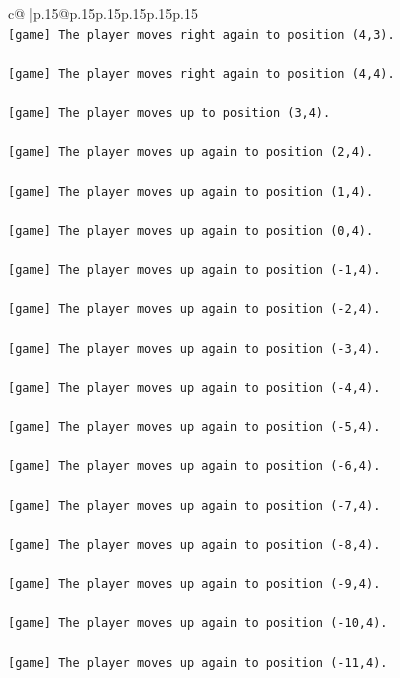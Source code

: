\documentclass{article}
\begin{document}
{\begin{supertabular}{c@{$\;$}|p{.15\linewidth}@{}p{.15\linewidth}p{.15\linewidth}p{.15\linewidth}p{.15\linewidth}p{.15\linewidth}}
{{{\\ 
\texttt{{[}game{]} The player moves right again to position (4,3).} \\
\\ 
\texttt{{[}game{]} The player moves right again to position (4,4).} \\
\\ 
\texttt{{[}game{]} The player moves up to position (3,4).} \\
\\ 
\texttt{{[}game{]} The player moves up again to position (2,4).} \\
\\ 
\texttt{{[}game{]} The player moves up again to position (1,4).} \\
\\ 
\texttt{{[}game{]} The player moves up again to position (0,4).} \\
\\ 
\texttt{{[}game{]} The player moves up again to position ({-}1,4).} \\
\\ 
\texttt{{[}game{]} The player moves up again to position ({-}2,4).} \\
\\ 
\texttt{{[}game{]} The player moves up again to position ({-}3,4).} \\
\\ 
\texttt{{[}game{]} The player moves up again to position ({-}4,4).} \\
\\ 
\texttt{{[}game{]} The player moves up again to position ({-}5,4).} \\
\\ 
\texttt{{[}game{]} The player moves up again to position ({-}6,4).} \\
\\ 
\texttt{{[}game{]} The player moves up again to position ({-}7,4).} \\
\\ 
\texttt{{[}game{]} The player moves up again to position ({-}8,4).} \\
\\ 
\texttt{{[}game{]} The player moves up again to position ({-}9,4).} \\
\\ 
\texttt{{[}game{]} The player moves up again to position ({-}10,4).} \\
\\ 
\texttt{{[}game{]} The player moves up again to position ({-}11,4).} \\
}}}
\end{supertabular}}
\end{document}
